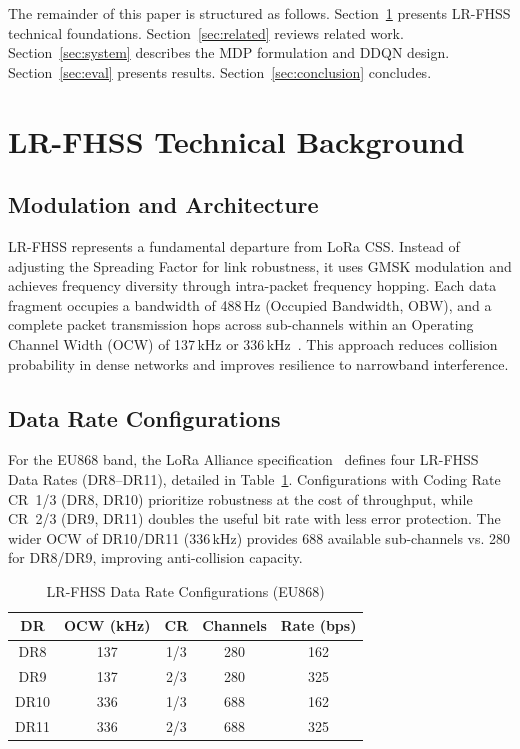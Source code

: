 \documentclass[conference]{IEEEtran}
\begin{document}
	The remainder of this paper is structured as follows.
	Section~\ref{sec:background} presents LR-FHSS technical foundations.
	Section~\ref{sec:related} reviews related work.
	Section~\ref{sec:system} describes the MDP formulation and DDQN design.
	Section~\ref{sec:eval} presents results.
	Section~\ref{sec:conclusion} concludes.
	
	\section{LR-FHSS Technical Background}
	\label{sec:background}
	
	\subsection{Modulation and Architecture}
	
	LR-FHSS represents a fundamental departure from LoRa CSS. Instead of
	adjusting the Spreading Factor for link robustness, it uses GMSK modulation
	and achieves frequency diversity through intra-packet frequency hopping. Each
	data fragment occupies a bandwidth of 488\,Hz (Occupied Bandwidth, OBW), and a
	complete packet transmission hops across sub-channels within an Operating
	Channel Width (OCW) of 137\,kHz or 336\,kHz~\cite{semtech2022lrfhss}. This
	approach reduces collision probability in dense networks and improves resilience
	to narrowband interference.
	
	\subsection{Data Rate Configurations}
	
	For the EU868 band, the LoRa Alliance specification~\cite{loraalliance2025regional}
	defines four LR-FHSS Data Rates (DR8--DR11), detailed in Table~\ref{tab:dr_config}.
	Configurations with Coding Rate CR~1/3 (DR8, DR10) prioritize robustness at the
	cost of throughput, while CR~2/3 (DR9, DR11) doubles the useful bit rate with
	less error protection. The wider OCW of DR10/DR11 (336\,kHz) provides 688
	available sub-channels vs. 280 for DR8/DR9, improving anti-collision capacity.
	
	\begin{table}[!t]
		\centering
		\caption{LR-FHSS Data Rate Configurations (EU868)}
		\label{tab:dr_config}
		\begin{tabular}{|c|c|c|c|c|}
			\hline
			\textbf{DR} & \textbf{OCW (kHz)} & \textbf{CR} & \textbf{Channels} & \textbf{Rate (bps)} \\
			\hline
			DR8  & 137 & 1/3 & 280 & 162 \\
			DR9  & 137 & 2/3 & 280 & 325 \\
			DR10 & 336 & 1/3 & 688 & 162 \\
			DR11 & 336 & 2/3 & 688 & 325 \\
			\hline
		\end{tabular}
	\end{table}
	
\end{document}
